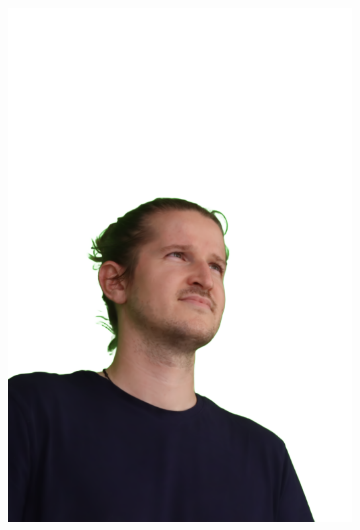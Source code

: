 \begin{figure}[!ht]
\begin{subfigure}{0.12\linewidth}
        \includegraphics[width=\textwidth]{Figures/results/initials/ephra/14_render.png}

\end{subfigure}
\end{figure}
